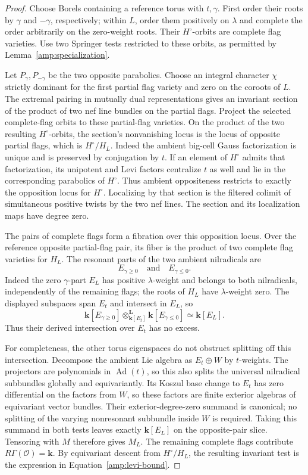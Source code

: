 \begin{proof}
Choose Borels containing a reference torus with $t,\gamma$.
First order their roots by $\gamma$ and $-\gamma$, respectively;
within $L$, order them positively on $\lambda$ and complete the
order arbitrarily on the zero-weight roots.  Their
$H^\circ$-orbits are complete flag varieties.  Use two Springer
tests restricted to these orbits, as permitted by
Lemma~\ref{amp:specialization}.

Let $P_\gamma,P_{-\gamma}$ be the two opposite parabolics.
Choose an integral character $\chi$ strictly dominant for the first
partial flag variety and zero on the coroots of $L$.
The extremal pairing in mutually dual representations gives an
invariant section of the product of two nef line bundles on the
partial flags. Project the selected complete-flag orbits to these
partial-flag varieties. On the product of the two resulting
$H^\circ$-orbits, the section's nonvanishing locus is the locus
of opposite partial flags, which is
$H^\circ/H_L$. Indeed the ambient big-cell Gauss factorization
is unique and is preserved by conjugation by $t$.  If an element
of $H^\circ$ admits that factorization, its unipotent and Levi
factors centralize $t$ as well and lie in the corresponding
parabolics of $H^\circ$.  Thus ambient oppositeness restricts to
exactly the opposition locus for $H^\circ$.  Localizing by that section is the filtered colimit
of simultaneous positive twists by the two nef lines.
The section and its localization maps have degree zero.

The pairs of complete flags form a fibration over this opposition
locus. Over the reference opposite partial-flag pair, its fiber is
the product of two complete flag varieties for $H_L$. The resonant
parts of the two ambient nilradicals are
\[
 E_{\gamma\geq0}\quad\text{and}\quad E_{\gamma\leq0}.
\]
Indeed the zero $\gamma$-part $E_L$ has positive $\lambda$-weight
and belongs to both nilradicals, independently of the remaining
flags; the roots of $H_L$ have $\lambda$-weight zero.
The displayed subspaces span $E_t$ and intersect in $E_L$, so
\[
 \mathbf k[E_{\gamma\geq0}]
   \otimes^{\mathbf L}_{\mathbf k[E_t]}
 \mathbf k[E_{\gamma\leq0}]
 \simeq \mathbf k[E_L].
\]
Thus their derived intersection over $E_t$ has no excess.

For completeness, the other torus eigenspaces do not obstruct
splitting off this intersection.  Decompose the ambient Lie
algebra as $E_t\oplus W$ by $t$-weights.  The projectors are
polynomials in $\operatorname{Ad}(t)$, so this also splits the
universal nilradical subbundles globally and equivariantly.  Its Koszul base change to $E_t$ has zero differential
on the factors from $W$, so these factors are finite exterior
algebras of equivariant vector bundles.  Their exterior-degree-zero
summand is canonical; no splitting of the varying nonresonant
subbundle inside $W$ is required.  Taking this summand in both tests leaves
exactly $\mathbf k[E_L]$ on the opposite-pair slice. Tensoring with
$M$ therefore gives $M_L$. The remaining
complete flags contribute
$R\Gamma(\mathcal O)=\mathbf k$.  By equivariant descent from
$H^\circ/H_L$, the resulting invariant test is the expression in
Equation~\eqref{amp:levi-bound}.


\end{proof}
